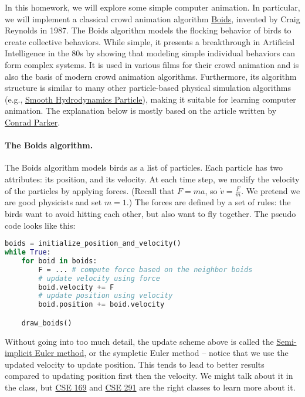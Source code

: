 




In this homework, we will explore some simple computer animation. In particular, we will implement a classical crowd animation algorithm \href{https://en.wikipedia.org/wiki/Boids}{Boids}, invented by Craig Reynolds in 1987. The Boids algorithm models the flocking behavior of birds to create collective behaviors. While simple, it presents a breakthrough in Artificial Intelligence in the 80s by showing that modeling simple individual behaviors can form complex systems. It is used in various films for their crowd animation and is also the basis of modern crowd animation algorithms. Furthermore, its algorithm structure is similar to many other particle-based physical simulation algorithms (e.g., \href{https://en.wikipedia.org/wiki/Smoothed-particle_hydrodynamics}{Smooth Hydrodynamics Particle}), making it suitable for learning computer animation. The explanation below is mostly based on the article written by \href{https://vergenet.net/~conrad/boids/pseudocode.html}{Conrad Parker}.

\paragraph{The Boids algorithm.} The Boids algorithm models birds as a list of particles. Each particle has two attributes: its position, and its velocity. At each time step, we modify the velocity of the particles by applying forces. (Recall that $F = ma$, so $\dot{v} = \frac{F}{m}$. We pretend we are good physicists and set $m=1$.) The forces are defined by a set of rules: the birds want to avoid hitting each other, but also want to fly together. The pseudo code looks like this:
\begin{lstlisting}[language=Python]
boids = initialize_position_and_velocity()
while True:
	for boid in boids:
		F = ... # compute force based on the neighbor boids
		# update velocity using force
		boid.velocity += F
		# update position using velocity
		boid.position += boid.velocity

	draw_boids()
\end{lstlisting}
Without going into too much detail, the update scheme above is called the \href{https://en.wikipedia.org/wiki/Semi-implicit_Euler_method}{Semi-implicit Euler method}, or the sympletic Euler method -- notice that we use the updated velocity to update position. This tends to lead to better results compared to updating position first then the velocity. We might talk about it in the class, but \href{https://cseweb.ucsd.edu/classes/wi20/cse169-a/index.html}{CSE 169} and \href{https://cseweb.ucsd.edu/~alchern/teaching/cse291_sp23/}{CSE 291} are the right classes to learn more about it.

